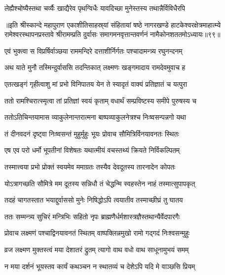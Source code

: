 \twolineshloka
{लेह्यैश्चोष्यैस्तथा चर्व्यैः खाद्यैरेव पृथग्विधैः}
{यावदिच्छा मुनेस्तस्य तथान्नैर्विविधैरपि}%

॥इति श्रीस्कान्दे महापुराण एकाशीतिसाहस्र्यां संहितायां षष्ठे नागरखण्डे हाटकेश्वरक्षेत्रमाहात्म्ये रामेश्वरस्थापनप्रस्तावे श्रीरामम्प्रति दुर्वासः समागमनवृत्तान्तवर्णनं नामैकोनशततमोऽध्यायः॥९९॥

\resetShloka


\twolineshloka
{एवं भुक्त्वा स विप्रर्षिर्वाञ्छया राममन्दिरे}
{दत्ताशीर्निर्गतः पश्चादामन्त्र्य रघुनन्दनम्}%

\twolineshloka
{अथ याते मुनौ तस्मिन्दुर्वाससि तदन्तिकात्}
{लक्ष्मणः खङ्गमादाय रामदेवमुवाच ह}%

\twolineshloka
{एतत्खङ्गं गृहीत्वाशु मां प्रभो विनिपातय}
{येन ते स्यादृतं वाक्यं प्रतिज्ञातं च यत्पुरा}%

\twolineshloka
{ततो रामश्चिरात्स्मृत्वा तां प्रतिज्ञां स्वयं कृताम्}
{वधार्थं सम्प्रविष्टस्य समीपे पुरुषस्य च}%

\twolineshloka
{ततोऽतिचिन्तयामास व्याकुलेनान्तरात्मना}
{बाष्पव्याकुलनेत्रश्च निःष्वसन्पन्नगो यथा}%

\twolineshloka
{तं दीनवदनं दृष्ट्वा निःष्वसन्तं मुहुर्मुहुः}
{भूयः प्रोवाच सौमित्रिर्विनयावनतः स्थितः}%

\twolineshloka
{एष एव परो धर्मो भूपतीनां विशेषतः}
{यथात्मीयं वचस्तथ्यं क्रियते निर्विकल्पितम्}%

\twolineshloka
{तस्मात्त्वया प्रभो प्रोक्तं स्वयमेव ममाग्रतः}
{तस्यैव देवदूतस्य तारनादेन कोपतः}%

\twolineshloka
{योऽत्रागच्छति सौमित्रे मम दूतस्य सन्निधौ}
{तं चेद्धन्मि स्वहस्तेन नाहं तस्मात्सुपापकृत्}%

\twolineshloka
{तदहं चागतस्तात भयाद्दुर्वाससो मुनेः}
{निषिद्धोऽपि त्वयातीव तस्माच्छीघ्रं तु घातय}%

\twolineshloka
{ततः सम्मन्त्र्य सुचिरं मन्त्रिभिः सहितो नृपः}
{ब्राह्मणैर्धर्मशास्त्रज्ञैस्तथान्यैर्वेदपारगैः}%

\twolineshloka
{प्रोवाच लक्ष्मणं पश्चाद्विनयावनतं स्थितम्}
{वाष्पक्लिन्नमुखो रामो गद्गदं निःश्वसन्मुहुः}%

\twolineshloka
{व्रज लक्ष्मण मुक्तस्त्वं मया देशातरं द्रुतम्}
{त्यागो वाथ वधो वाथ साधूनामुभयं समम्}%

\twolineshloka
{न मया दर्शनं भूयस्तव कार्यं कथञ्चन}
{न स्थातव्यं च देशेऽपि यदि मे वाञ्छसि प्रियम्}%

